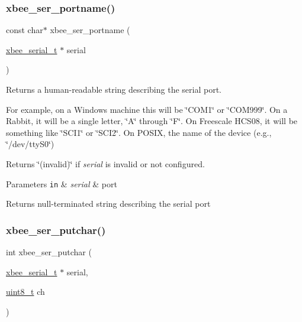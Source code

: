 \subsubsection{\texorpdfstring{xbee\+\_\+ser\+\_\+portname()}{xbee\_ser\_portname()}}
{\footnotesize\ttfamily const char$\ast$ xbee\+\_\+ser\+\_\+portname (\begin{DoxyParamCaption}\item[{\hyperlink{structxbee__serial__t}{xbee\+\_\+serial\+\_\+t} $\ast$}]{serial }\end{DoxyParamCaption})}



Returns a human-\/readable string describing the serial port. 

For example, on a Windows machine this will be \char`\"{}\+C\+O\+M1\char`\"{} or \char`\"{}\+C\+O\+M999\char`\"{}. On a Rabbit, it will be a single letter, \char`\"{}\+A\char`\"{} through \char`\"{}\+F\char`\"{}. On Freescale H\+C\+S08, it will be something like \char`\"{}\+S\+C\+I1\char`\"{} or \char`\"{}\+S\+C\+I2\char`\"{}. On P\+O\+S\+IX, the name of the device (e.\+g., \char`\"{}/dev/tty\+S0\char`\"{})

Returns \char`\"{}(invalid)\char`\"{} if {\itshape serial} is invalid or not configured.


\begin{DoxyParams}[1]{Parameters}
\mbox{\tt in}  & {\em serial} & port\\
\hline
\end{DoxyParams}
\begin{DoxyReturn}{Returns}
null-\/terminated string describing the serial port 
\end{DoxyReturn}
\mbox{\label{group__hal__posix_ga86fea2345efb8bf9424228f0979b1849}} 
\subsubsection{\texorpdfstring{xbee\+\_\+ser\+\_\+putchar()}{xbee\_ser\_putchar()}}
{\footnotesize\ttfamily int xbee\+\_\+ser\+\_\+putchar (\begin{DoxyParamCaption}\item[{\hyperlink{structxbee__serial__t}{xbee\+\_\+serial\+\_\+t} $\ast$}]{serial,  }\item[{\hyperlink{group__hal__dos_gae1affc9ca37cfb624959c866a73f83c2}{uint8\+\_\+t}}]{ch }\end{DoxyParamCaption})}



